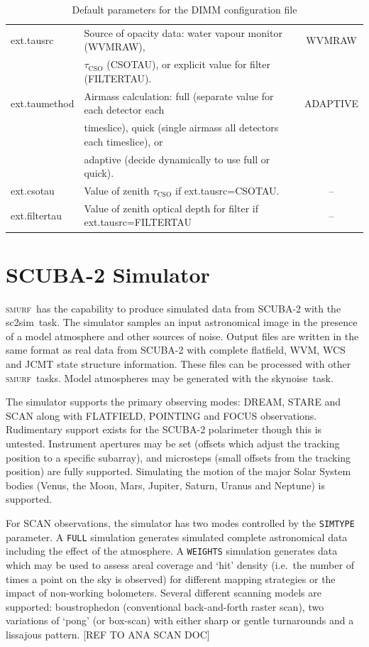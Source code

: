 \documentclass[twoside,11pt]{article}
\newcommand{\xref}[3]{#1}
\newcommand{\xlabel}[1]{}
\renewcommand{\_}{\texttt{\symbol{95}}}
\newcommand{\SMURF}{\textsc{smurf}}
\newcommand{\task}[1]{\textsf{#1}}
\newcommand{\sctwosim}{\xref{\task{sc2sim}}{sun258}{SC2SIM}}
\newcommand{\skynoise}{\xref{\task{skynoise}}{sun258}{SKYNOISE}}
\begin{document}
\begin{table}
\begin{tabular}{llc}
ext.tausrc       & Source of opacity data: water vapour monitor (WVMRAW),              & WVMRAW \\
                 & $\tau_\mathrm{CSO}$ (CSOTAU), or explicit value for filter (FILTERTAU). & \\
ext.taumethod    & Airmass calculation: full (separate value for each detector each    & ADAPTIVE \\
                 & timeslice), quick (single airmass all detectors each timeslice), or & \\
                 & adaptive (decide dynamically to use full or quick).                 & \\
ext.csotau       & Value of zenith $\tau_\mathrm{CSO}$ if ext.tausrc=CSOTAU.            & -- \\
ext.filtertau    & Value of zenith optical depth for filter if ext.tausrc=FILTERTAU    & -- \\
\hline
\hline
\end{tabular}
\normalsize
\caption{Default parameters for the DIMM configuration file}
\label{tab:dimmconfig}
\end{table}

\section{\xlabel{simulator}SCUBA-2 Simulator\label{se:sc2sim}}

\SMURF\ has the capability to produce simulated data from SCUBA-2 with
the \sctwosim\ task. The simulator samples an input astronomical image
in the presence of a model atmosphere and other sources of noise.
Output files are written in the same format as real data from SCUBA-2
with complete flatfield, WVM, WCS and JCMT state structure
information. These files can be processed with other \SMURF\
tasks. Model atmospheres may be generated with the \skynoise\ task.

The simulator supports the primary observing modes: DREAM, STARE and
SCAN along with FLATFIELD, POINTING and FOCUS
observations. Rudimentary support exists for the SCUBA-2 polarimeter
though this is untested. Instrument apertures may be set (offsets
which adjust the tracking position to a specific subarray), and
microsteps (small offsets from the tracking position) are fully
supported. Simulating the motion of the major Solar System bodies
(Venus, the Moon, Mars, Jupiter, Saturn, Uranus and Neptune) is
supported.

For SCAN observations, the simulator has two modes controlled by the
\texttt{SIMTYPE} parameter. A \texttt{FULL} simulation generates
simulated complete astronomical data including the effect of the
atmosphere. A \texttt{WEIGHTS} simulation generates data which may be
used to assess areal coverage and `hit' density (i.e.\ the number of
times a point on the sky is observed) for different mapping strategies
or the impact of non-working bolometers. Several different scanning
models are supported: boustrophedon (conventional back-and-forth
raster scan), two variations of `pong' (or box-scan) with either
sharp or gentle turnarounds and a lissajous pattern. [REF TO ANA SCAN DOC]
\end{document}
